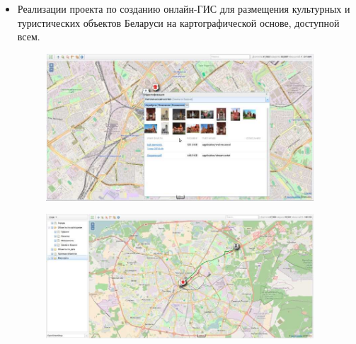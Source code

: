 \documentclass[10pt, a5paper]{article}
\begin{document}
\begin{itemize}
  \item Реализации проекта по созданию онлайн-ГИС для размещения культурных и туристических объектов Беларуси на картографической основе, доступной всем.
\begin{center}

\begin{figure}[h!]
  \centering
  \includegraphics[width=10cm]{stepanov2.jpg}
  
  \label{Stepanov2}
\end{figure}
\begin{center}

\begin{figure}[h!]
  \centering
  \includegraphics[width=10cm]{stepanov3.jpg}
  
  \label{Stepanov3}
\end{figure}

\end{center}

\end{center}


\end{itemize}
\end{document}
